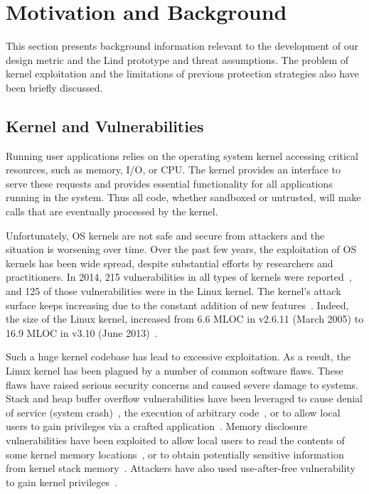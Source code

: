 \section{Motivation and Background}
\label{sec.motivation-and-background}

This section presents background information 
relevant to the development of our design metric and the Lind prototype and threat assumptions. The problem of kernel exploitation and the limitations of previous protection strategies also have been briefly discussed. 

\subsection{Kernel and Vulnerabilities}

Running user applications relies on the operating system kernel 
accessing critical resources, such as memory, I/O, or CPU. 
The kernel provides an interface to serve these requests 
and provides essential functionality for all applications running in the
system. 
Thus all code, whether sandboxed or untrusted, will make calls 
that are eventually processed by the kernel. 

Unfortunately, OS kernels are not safe and secure from
attackers and the situation is worsening over time. 
Over the past few years, the exploitation of OS kernels has been wide
spread, 
despite substantial efforts by researchers and practitioners. 
In 2014, 215 vulnerabilities in all types of kernels were reported~\cite{NVD}, 
and 125 of those vulnerabilities were in the Linux kernel. 
The kernel's
attack surface keeps increasing due to the constant addition of new
features~\cite{Metrics-13}. 
Indeed, the size of the Linux kernel, increased from 6.6 MLOC in v2.6.11 
(March 2005) to 16.9 MLOC in v3.10 (June 2013)~\cite{Linux-13}. 


Such a huge kernel codebase has lead to excessive exploitation. 
As a result, the Linux kernel has been plagued by a number of common
software flaws. 
These flaws have raised serious security concerns and caused severe damage
to systems. 
Stack and heap buffer overflow vulnerabilities have been leveraged to 
cause denial of service (system crash)~\cite{CVE-2013-2892}, 
the execution of arbitrary code~\cite{CVE-2009-3234}, 
or to allow local users to gain privileges via a crafted 
application~\cite{CVE-2013-1828}. 
Memory disclosure vulnerabilities have been exploited to allow local users
to read 
the contents of some kernel memory locations~\cite{CVE-2009-3002}, or to
obtain potentially 
sensitive information from kernel stack memory~\cite{CVE-2010-4073}. 
Attackers have also used use-after-free vulnerability to gain kernel
privileges~\cite{CVE-2013-4343}.

